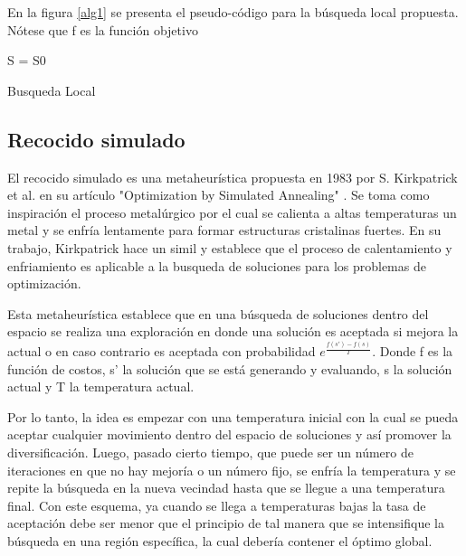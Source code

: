 \documentclass{ci5652}
\begin{document}
En la figura \ref{alg1} se presenta el pseudo-código para la búsqueda local propuesta. Nótese que f es la función objetivo

\begin{algorithm}
 \label{alg1}
 \DontPrintSemicolon
 \vspace*{0.1cm}
 S = S0 
 \vspace*{0.1cm}
 \caption{Busqueda Local}
\end{algorithm}

\subsection{Recocido simulado}
 
 El recocido simulado es una metaheurística propuesta en 1983 por S. Kirkpatrick et al. en su artículo "Optimization by Simulated Annealing" \cite{7}. Se toma como inspiración el proceso metalúrgico por el cual se calienta a altas temperaturas un metal y se enfría lentamente para formar estructuras cristalinas fuertes.
 En su trabajo, Kirkpatrick hace un simil y establece que el proceso de calentamiento y enfriamiento es aplicable a la busqueda de soluciones para los problemas de optimización.

Esta metaheurística establece que en una búsqueda de soluciones dentro del espacio se realiza una exploración en donde una solución es aceptada si mejora la actual o en caso contrario es aceptada con probabilidad $e^{\frac{f(s')-f(s)}{T}}$. Donde f es la función de costos, s' la solución que se está generando y evaluando, s la solución actual y T la temperatura actual.

Por lo tanto, la idea es empezar con una temperatura inicial con la cual se pueda aceptar cualquier movimiento dentro del espacio de soluciones y así promover la diversificación. Luego, pasado cierto tiempo, que puede ser un número de iteraciones en que no hay mejoría o un número fijo, se enfría la temperatura y se repite la búsqueda en la nueva vecindad hasta que se llegue a una temperatura final. Con este esquema, ya cuando se llega a temperaturas bajas la tasa de aceptación debe ser menor que el principio de tal manera que se intensifique la búsqueda en una región específica, la cual debería contener el óptimo global.
\end{document}
